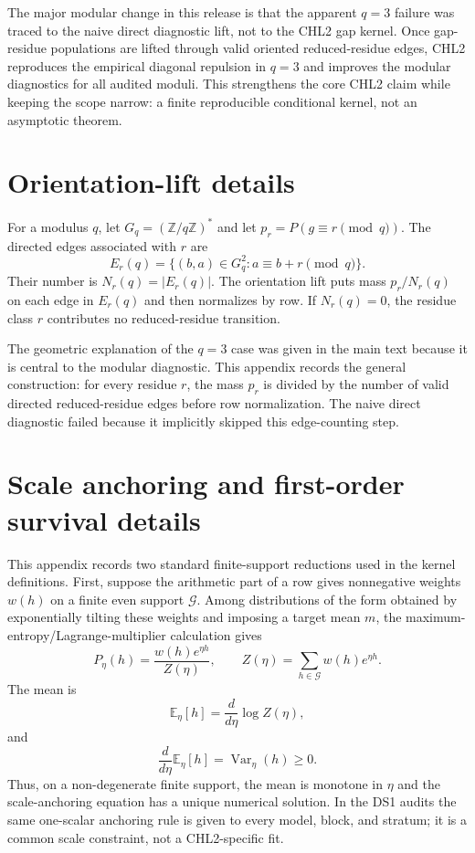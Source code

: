 \documentclass[10pt]{article}
\begin{document}
The major modular change in this release is that the apparent $q=3$ failure was traced to the naive direct diagnostic lift, not to the CHL2 gap kernel.  Once gap-residue populations are lifted through valid oriented reduced-residue edges, CHL2 reproduces the empirical diagonal repulsion in $q=3$ and improves the modular diagnostics for all audited moduli.  This strengthens the core CHL2 claim while keeping the scope narrow: a finite reproducible conditional kernel, not an asymptotic theorem.

\appendix
\section{Orientation-lift details}
For a modulus $q$, let $G_q=(\mathbb Z/q\mathbb Z)^*$ and let $p_r=P(g\equiv r\pmod q)$.  The directed edges associated with $r$ are
\[
E_r(q)=\{(b,a)\in G_q^2: a\equiv b+r\pmod q\}.
\]
Their number is $N_r(q)=|E_r(q)|$.  The orientation lift puts mass $p_r/N_r(q)$ on each edge in $E_r(q)$ and then normalizes by row.  If $N_r(q)=0$, the residue class $r$ contributes no reduced-residue transition.

The geometric explanation of the $q=3$ case was given in the main text because it is central to the modular diagnostic.  This appendix records the general construction: for every residue $r$, the mass $p_r$ is divided by the number of valid directed reduced-residue edges before row normalization.  The naive direct diagnostic failed because it implicitly skipped this edge-counting step.


\section{Scale anchoring and first-order survival details}\label{app:maxent-poisson}
This appendix records two standard finite-support reductions used in the kernel definitions.  First, suppose the arithmetic part of a row gives nonnegative weights $w(h)$ on a finite even support $\mathcal G$.  Among distributions of the form obtained by exponentially tilting these weights and imposing a target mean $m$, the maximum-entropy/Lagrange-multiplier calculation gives
\[
P_\eta(h)=\frac{w(h)e^{\eta h}}{Z(\eta)},
\qquad
Z(\eta)=\sum_{h\in\mathcal G}w(h)e^{\eta h}.
\]
The mean is
\[
\mathbb E_\eta[h]=\frac{d}{d\eta}\log Z(\eta),
\]
and
\[
\frac{d}{d\eta}\mathbb E_\eta[h]=\operatorname{Var}_\eta(h)\ge0.
\]
Thus, on a non-degenerate finite support, the mean is monotone in $\eta$ and the scale-anchoring equation has a unique numerical solution.  In the DS1 audits the same one-scalar anchoring rule is given to every model, block, and stratum; it is a common scale constraint, not a CHL2-specific fit.
\end{document}
